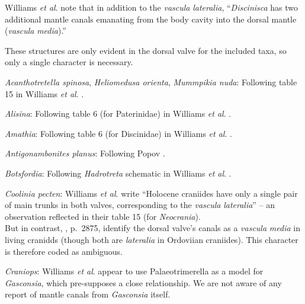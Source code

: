 \documentclass[openany]{book}
\theoremstyle{definition}
\theoremstyle{definition}
\theoremstyle{definition}
\theoremstyle{remark}
\begin{document}
Williams \emph{et al}. \citeyearpar{Williams1997Introduction} note that
in addition to the \emph{vascula} \emph{lateralia}, ``\emph{Discinisca}
has two additional mantle canals emanating from the body cavity into the
dorsal mantle (\emph{vascula} \emph{media}).''

These structures are only evident in the dorsal valve for the included
taxa, so only a single character is necessary.

\hypertarget{Acanthotretella_spinosa-coding-33}{}
\emph{Acanthotretella spinosa}, \emph{Heliomedusa orienta},
\emph{Mummpikia nuda}: Following table 15 in Williams \emph{et al}.
\citeyearpar{Williams2000LinguliformeaCraniiformea}.

\hypertarget{Alisina-coding-33}{}
\emph{Alisina}: Following table 6 (for Paterinidae) in Williams \emph{et
al}. \citeyearpar{Williams2000LinguliformeaCraniiformea}.

\hypertarget{Amathia-coding-33}{}
\emph{Amathia}: Following table 6 (for Discinidae) in Williams \emph{et
al}. \citeyearpar{Williams2000LinguliformeaCraniiformea}.

\hypertarget{Antigonambonites_planus-coding-33}{}
\emph{Antigonambonites planus}: Following Popov \citeyearpar[fig.
2]{Popov1992TheCambrian}.

\hypertarget{Botsfordia-coding-33}{}
\emph{Botsfordia}: Following \emph{Hadrotreta} schematic in Williams
\emph{et al}. \citeyearpar{Williams2000LinguliformeaCraniiformea}.

\hypertarget{Coolinia_pecten-coding-33}{}
\emph{Coolinia pecten}: Williams \emph{et al}.
\citeyearpar{Williams2000LinguliformeaCraniiformea} write ``Holocene
craniides have only a single pair of main trunks in both valves,
corresponding to the \emph{vascula} \emph{lateralia}'' -- an observation
reflected in their table 15 (for \emph{Neocrania}).\\
But in contrast, \citet{Williams2007Supplement}, p.~2875, identify the
dorsal valve's canals as a \emph{vascula} \emph{media} in living
cranidds (though both are \emph{lateralia} in Ordoviian craniides). This
character is therefore coded as ambiguous.

\hypertarget{Craniops-coding-33}{}
\emph{Craniops}: Williams \emph{et al}. \citeyearpar[table
15]{Williams2000LinguliformeaCraniiformea} appear to use
Palaeotrimerella \citep[as drawn in][]{Williams1997Introduction} as a
model for \emph{Gasconsia}, which pre-supposes a close relationship. We
are not aware of any report of mantle canals from \emph{Gasconsia}
itself.
\end{document}
